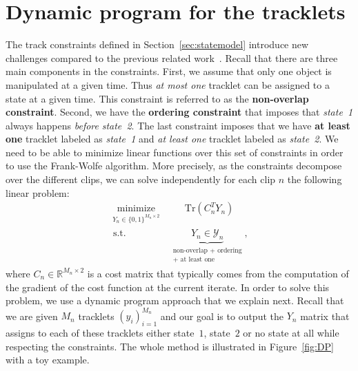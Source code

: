 \section{Dynamic program for the tracklets}
\label{app:dp}
The track constraints defined in Section~\ref{sec:statemodel} introduce new challenges compared to the previous related work~\cite{Alayrac15Unsupervised,Bojanowski14weakly,Joulin14efficient}.
Recall that there are three main components in the constraints.
First, we assume that only one object is manipulated at a given time. 
Thus \emph{at most one} tracklet can be assigned to a state at a given time.
This constraint is referred to as the \textbf{non-overlap constraint}.
Second, we have the \textbf{ordering constraint} that imposes that \emph{state~1} always happens \emph{before} \emph{state~2}.
The last constraint imposes that we have \textbf{at least one} tracklet labeled as \emph{state~1} and \emph{at least one} tracklet labeled as \emph{state~2}.
We need to be able to minimize linear functions over this set of constraints in order to use the Frank-Wolfe algorithm.
More precisely, as the constraints decompose over the different clips, we can solve independently for each clip $n$ the following linear problem:
\begin{align}
\label{eq:linearprogram}
\underset{\substack{Y_n\in\{0,1\}^{M_n\times 2}}}{\text{minimize}}  & \phantom{aa:}\text{Tr}(C_n^TY_n) \\
\text{ s.t. }   & \underbrace{Y_n \in \mathcal{Y}_n}_{\substack{\text{non-overlap + ordering}\\\text{+ at least one}}},   \nonumber
\end{align}
where $C_n\in\mathbb{R}^{M_n\times 2}$ is a cost matrix that typically comes from the computation of the gradient of the cost function at the current iterate.
In order to solve this problem, we use a dynamic program approach that we explain next.
Recall that we are given $M_n$ tracklets $(y_i)_{i=1}^{M_n}$ and our goal is to output the $Y_n$ matrix that assigns to each of these tracklets either state~$1$, state~$2$ or no state at all while respecting the constraints.
The whole method is illustrated in Figure~\ref{fig:DP} with a toy example.

